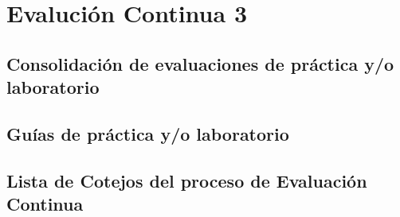 

\chapter{Evalución Continua 3}
\newpage
% 
% 
% 

\pagestyle{empty} %




\section{Consolidación de evaluaciones de práctica y/o laboratorio}
\section{Guías de práctica y/o laboratorio}
\section{Lista de Cotejos del proceso de Evaluación Continua}



